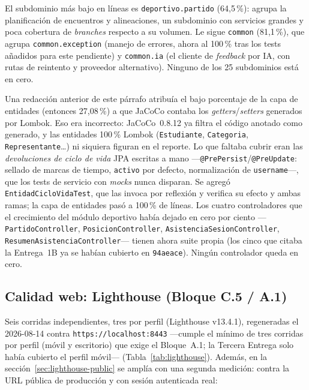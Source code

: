 \documentclass[11pt,a4paper]{article}
\begin{document}
El subdominio más bajo en líneas es \texttt{deportivo.partido}
(64,5\,\%): agrupa la planificación de encuentros y alineaciones, un
subdominio con servicios grandes y poca cobertura de \emph{branches}
respecto a su volumen. Le sigue \texttt{common} (81,1\,\%),
que agrupa \texttt{common.exception} (manejo de errores, ahora al
100\,\% tras los tests añadidos para este pendiente) y \texttt{common.ia}
(el cliente de \emph{feedback} por IA, con rutas de reintento y
proveedor alternativo). Ninguno de los 25 subdominios está en cero.

Una redacción anterior de este párrafo atribuía el bajo porcentaje de la
capa de entidades (entonces 27,08\,\%) a que JaCoCo contaba los
\emph{getters}/\emph{setters} generados por Lombok. Eso era incorrecto:
JaCoCo~0.8.12 ya filtra el código anotado como generado, y las entidades
100\,\% Lombok (\texttt{Estudiante}, \texttt{Categoria},
\texttt{Representante}\ldots) ni siquiera figuran en el reporte. Lo que
faltaba cubrir eran las \emph{devoluciones de ciclo de vida} JPA escritas
a mano —\texttt{@PrePersist}/\texttt{@PreUpdate}: sellado de marcas de
tiempo, \texttt{activo} por defecto, normalización de \texttt{username}—,
que los tests de servicio con \emph{mocks} nunca disparan. Se agregó
\texttt{EntidadCicloVidaTest}, que las invoca por reflexión y verifica su
efecto y ambas ramas; la capa de entidades pasó a 100\,\% de líneas.
Los cuatro controladores que el crecimiento del módulo deportivo había
dejado en cero por ciento —\texttt{PartidoController},
\texttt{PosicionController}, \texttt{AsistenciaSesionController},
\texttt{ResumenAsistenciaController}— tienen ahora suite propia
(los cinco que citaba la Entrega~1B ya se habían cubierto en
\texttt{94aeace}). Ningún controlador queda en cero.

\subsection{Calidad web: Lighthouse (Bloque C.5 / A.1)}

Seis corridas independientes, tres por perfil (Lighthouse v13.4.1),
regeneradas el 2026-08-14 contra \texttt{https://localhost:8443}
—cumple el mínimo de tres corridas por perfil (móvil y escritorio) que
exige el Bloque~A.1; la Tercera Entrega solo había cubierto el perfil
móvil— (Tabla~\ref{tab:lighthouse}). Además, en la
sección~\ref{sec:lighthouse-public} se amplía con una segunda medición:
contra la URL pública de producción y con sesión autenticada real:
\end{document}
